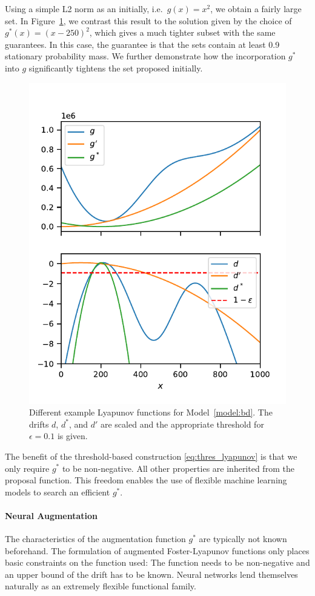 Using a simple L2 norm as an initially, i.e.\ $g(x) = x^2$, we obtain a fairly large set.
In Figure~\ref{fig:bd:truncation}, we contrast this result to the solution given by the choice of $g^*(x)=(x - 250)^2$, which gives a much tighter subset with the same guarantees.
In this case, the guarantee is that the sets contain at least 0.9 stationary probability mass.
We further demonstrate how the incorporation $g^*$ into $g$ significantly tightens the set proposed initially.
\begin{figure}[htb]
    \centering
    \includegraphics[width=.6\textwidth]{gfx/lyapunov_bd.pdf}
    \caption[Augmented Foster-Lyapunov function]{\label{fig:bd:truncation}Different example Lyapunov functions for Model~\ref{model:bd}. The drifts $d$, $d^*$, and $d'$ are scaled and the appropriate threshold for $\epsilon=0.1$ is given.}
\end{figure}


The benefit of the threshold-based construction \eqref{eq:thres_lyapunov} is that we only require $g^*$ to be non-negative.
All other properties are inherited from the proposal function.
This freedom enables the use of flexible machine learning models to search an efficient $g^*$.


\paragraph{Neural Augmentation}
The characteristics of the augmentation function $g^*$ are typically not known beforehand.
The formulation of augmented Foster-Lyapunov functions only places basic constraints on the function used:
The function needs to be non-negative and an upper bound of the drift has to be known.
Neural networks lend themselves naturally as an extremely flexible functional family.

